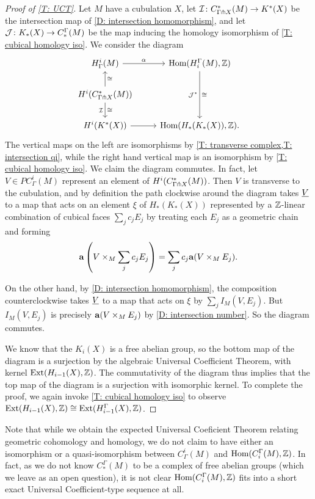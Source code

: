 \begin{proof}[Proof of \cref{T: UCT}]
	Let $M$ have a cubulation $X$, let $\mathcal{I} \colon C_{\Gamma \pitchfork X}^*(M) \to K^*(X)$ be the intersection map of \cref{D: intersection homomorphism},
	and let $\mathcal{J} \colon K_*(X) \to C^\Gamma_*(M)$ be the map inducing the homology isomorphism of \cref{T: cubical homology iso}.
	We consider the diagram
	\[
	\begin{tikzcd}
		H^i_\Gamma(M) \arrow[r, "\alpha"] & \Hom(H_i^\Gamma(M),\Z) \arrow[dd, "\cong", "\mc J^*"'] \\
		H^i(C^*_{\Gamma \pf X}(M)) \arrow[u, "\cong"'] \arrow[d, "\cong", "\mc I"'] & \\
		H^i(K^*(X)) \arrow[r] & \Hom(H_*(K_*(X)), \Z).
	\end{tikzcd}
	\]
	The vertical maps on the left are isomorphisms by \cref{T: transverse complex,T: intersection qi}, while the right hand vertical map is an isomorphism by \cref{T: cubical homology iso}.
	We claim the diagram commutes.
	In fact, let $V \in PC_\Gamma^i(M)$ represent an element of $H^i(C^*_{\Gamma \pitchfork X}(M))$.
	Then $V$ is transverse to the cubulation, and by definition the path clockwise around the diagram takes $\underline{V}$ to a map that acts on an element $\xi$ of $H_*(K_*(X))$ represented by a $\mathbb{Z}$-linear combination of cubical faces $\sum_j c_j E_j$ by treating each $E_j$ as a geometric chain and forming
	$$\mathbf{a}\left( V \times_M \sum_jc_jE_j\right) = \sum_jc_j\mathbf{a}(V \times_M E_j).$$

	On the other hand, by \cref{D: intersection homomorphism}, the composition counterclockwise takes $\underline{V}$ to a map that acts on $\xi$ by $\sum_j I_M(V,E_j)$.
	But $I_M(V,E_j)$ is precisely $\mathbf{a}(V \times_M E_j)$ by \cref{D: intersection number}.
	So the diagram commutes.

	We know that the $K_i(X)$ is a free abelian group, so the bottom map of the diagram is a surjection by the algebraic Universal Coefficient Theorem, with kernel $\text{Ext}(H_{i-1}(X),\mathbb{Z})$.
	The commutativity of the diagram thus implies that the top map of the diagram is a surjection with isomorphic kernel.
	To complete the proof, we again invoke \cref{T: cubical homology iso} to observe $\text{Ext}(H_{i-1}(X),\mathbb{Z}) \cong \text{Ext}(H^\Gamma_{i-1}(X),\mathbb{Z})$.
\end{proof}

\begin{remark}
	Note that while we obtain the expected Universal Coeficient Theorem relating geometric cohomology and homology, we do not claim to have either an isomorphism or a quasi-isomorphism between $C^i_\Gamma(M)$ and $\textup{Hom}(C_i^\Gamma(M),\mathbb{Z})$.
	In fact, as we do not know $C_*^\Gamma(M)$ to be a complex of free abelian groups (which we leave as an open question), it is not clear $\textup{Hom}(C_i^\Gamma(M),\mathbb{Z})$ fits into a short exact Universal Coefficient-type sequence at all.
\end{remark}

